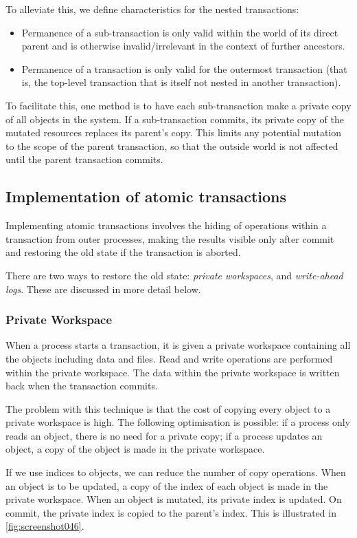 To alleviate this, we define characteristics for the nested transactions: \begin{itemize}
\item Permanence of a sub-transaction is only valid within the world of its direct parent and is otherwise invalid/irrelevant in the context of further ancestors.
\item Permanence of a transaction is only valid for the outermost transaction (that is, the top-level transaction that is itself not nested in another transaction).
\end{itemize}

To facilitate this, one method is to have each sub-transaction make a private copy of all objects in the system. If a sub-transaction commits, its private copy of the mutated resources replaces its parent's copy. This limits any potential mutation to the scope of the parent transaction, so that the outside world is not affected until the parent transaction commits.

\subsection{Implementation of atomic transactions}
Implementing atomic transactions involves the hiding of operations within a transaction from outer processes, making the results visible only after commit and restoring the old state if the transaction is aborted.

There are two ways to restore the old state: \textit{private workspaces}, and \textit{write-ahead logs}. These are discussed in more detail below.

\subsubsection{Private Workspace}
When a process starts a transaction, it is given a private workspace containing all the objects including data and files. Read and write operations are performed within the private workspace. The data within the private workspace is written back when the transaction commits. 

The problem with this technique is that the cost of copying every object to a private workspace is high. The following optimisation is possible: if a process only reads an object, there is no need for a private copy; if a process updates an object, a copy of the object is made in the private workspace. 

If we use indices to objects, we can reduce the number of copy operations. When an object is to be updated, a copy of the index of each object is made in the private workspace. When an object is mutated, its private index is updated. On commit, the private index is copied to the parent's index. This is illustrated in \autoref{fig:screenshot046}.

